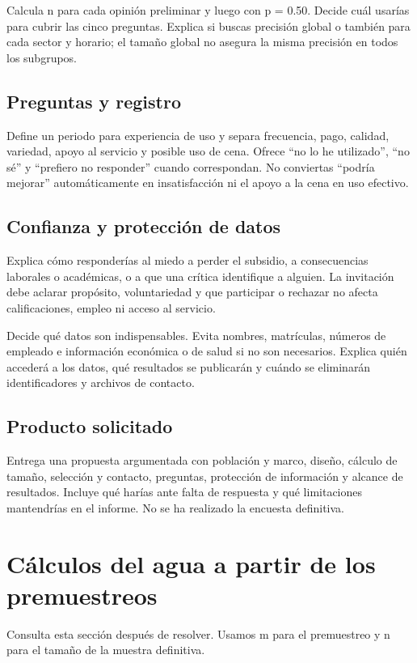 \documentclass[11pt,letterpaper]{article}
\begin{document}
Calcula n para cada opinión preliminar y luego con p = 0.50. Decide cuál usarías para cubrir las cinco preguntas. Explica si buscas precisión global o también para cada sector y horario; el tamaño global no asegura la misma precisión en todos los subgrupos.

\subsection{Preguntas y registro}
Define un periodo para experiencia de uso y separa frecuencia, pago, calidad, variedad, apoyo al servicio y posible uso de cena. Ofrece “no lo he utilizado”, “no sé” y “prefiero no responder” cuando correspondan. No conviertas “podría mejorar” automáticamente en insatisfacción ni el apoyo a la cena en uso efectivo.

\subsection{Confianza y protección de datos}
Explica cómo responderías al miedo a perder el subsidio, a consecuencias laborales o académicas, o a que una crítica identifique a alguien. La invitación debe aclarar propósito, voluntariedad y que participar o rechazar no afecta calificaciones, empleo ni acceso al servicio.

Decide qué datos son indispensables. Evita nombres, matrículas, números de empleado e información económica o de salud si no son necesarios. Explica quién accederá a los datos, qué resultados se publicarán y cuándo se eliminarán identificadores y archivos de contacto.

\subsection{Producto solicitado}
Entrega una propuesta argumentada con población y marco, diseño, cálculo de tamaño, selección y contacto, preguntas, protección de información y alcance de resultados. Incluye qué harías ante falta de respuesta y qué limitaciones mantendrías en el informe. No se ha realizado la encuesta definitiva.

\clearpage
\section{Cálculos del agua a partir de los premuestreos}
Consulta esta sección después de resolver. Usamos m para el premuestreo y n para el tamaño de la muestra definitiva.
\end{document}
